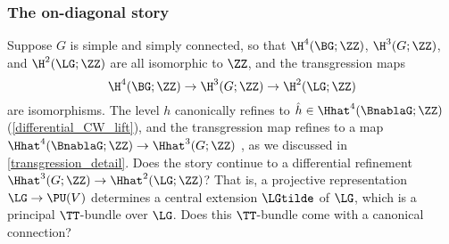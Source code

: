 \subsubsection{The on-diagonal story}
Suppose $G$ is simple and simply connected, so that $\H^4(\BG;\ZZ)$, $\H^3(G;\ZZ)$, and $\H^2(\LG;\ZZ)$ are all
isomorphic to $\ZZ$, and the transgression maps
\begin{equation*}
	\H^4(\BG;\ZZ)\to\H^3(G;\ZZ)\to\H^2(\LG;\ZZ)
\end{equation*}
are isomorphisms.%
The level $h$ canonically refines to $\hat h\in\Hhat^4(\BnablaG;\ZZ)$
(\cref{differential_CW_lift}), and the transgression map refines to a map
$\Hhat^4(\BnablaG;\ZZ)\to\Hhat^3(G;\ZZ)$ \cite[\S 3]{CJMSW05}, as we discussed in \cref{transgression_detail}. Does
the story continue to a differential refinement $\Hhat^3(G;\ZZ)\to\Hhat^2(\LG;\ZZ)$? That is, a projective
representation $\LG\to\PU(V)$ determines a central extension $\LGtilde$ of $\LG$, which is a principal
$\TT$-bundle over $\LG$. Does this $\TT$-bundle come with a canonical connection?

